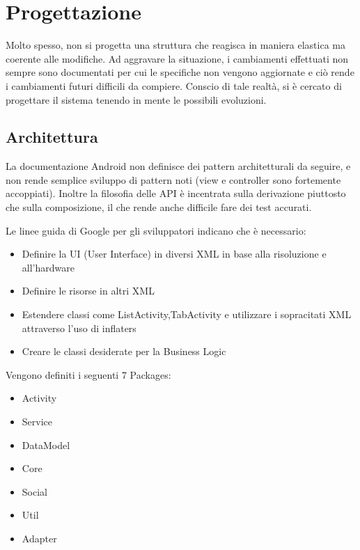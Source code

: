 \chapter{Progettazione} %

\label{Capitolo4} %


Molto spesso, non si progetta una struttura che reagisca in maniera elastica ma coerente alle modifiche.
Ad aggravare la situazione, i cambiamenti effettuati non sempre sono documentati per cui le specifiche non vengono aggiornate e ciò rende i cambiamenti futuri difficili da compiere. Conscio di tale realtà, si è cercato di progettare il sistema tenendo in mente le possibili evoluzioni.

\section{Architettura}

La documentazione Android non definisce dei pattern architetturali da seguire, e non rende semplice sviluppo di pattern noti (view e controller sono fortemente accoppiati). Inoltre la filosofia delle API è incentrata sulla derivazione piuttosto che sulla composizione, il che rende anche difficile fare dei test accurati.

Le linee guida di Google per gli sviluppatori indicano che è necessario:

\begin{itemize}
\item Definire la UI (User Interface) in diversi XML in base alla risoluzione e all'hardware
\item Definire le risorse in altri XML
\item Estendere classi come ListActivity,TabActivity e utilizzare i sopracitati XML attraverso l'uso di inflaters
\item Creare le classi desiderate per la Business Logic
\end{itemize}


Vengono definiti i seguenti 7 Packages:

\begin{itemize}
\item Activity
\item Service
\item DataModel
\item Core
\item Social
\item Util
\item Adapter
\end{itemize}


